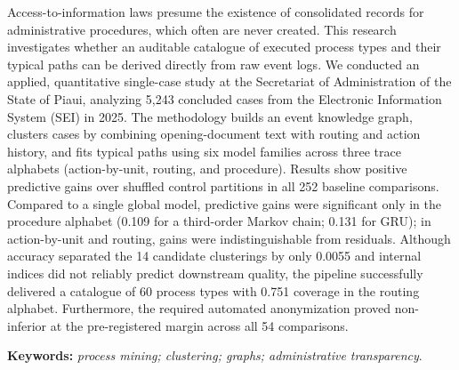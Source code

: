 \noindent Access-to-information laws presume the existence of consolidated records for administrative procedures, which often are never created. This research investigates whether an auditable catalogue of executed process types and their typical paths can be derived directly from raw event logs. We conducted an applied, quantitative single-case study at the Secretariat of Administration of the State of Piaui, analyzing 5,243 concluded cases from the Electronic Information System (SEI) in 2025. The methodology builds an event knowledge graph, clusters cases by combining opening-document text with routing and action history, and fits typical paths using six model families across three trace alphabets (action-by-unit, routing, and procedure). Results show positive predictive gains over shuffled control partitions in all 252 baseline comparisons. Compared to a single global model, predictive gains were significant only in the procedure alphabet (0.109 for a third-order Markov chain; 0.131 for GRU); in action-by-unit and routing, gains were indistinguishable from residuals. Although accuracy separated the 14 candidate clusterings by only 0.0055 and internal indices did not reliably predict downstream quality, the pipeline successfully delivered a catalogue of 60 process types with 0.751 coverage in the routing alphabet. Furthermore, the required automated anonymization proved non-inferior at the pre-registered margin across all 54 comparisons.

\vspace{0.6\baselineskip}
\noindent\textbf{Keywords:} \textit{process mining; clustering; graphs; administrative transparency}.

\newpage